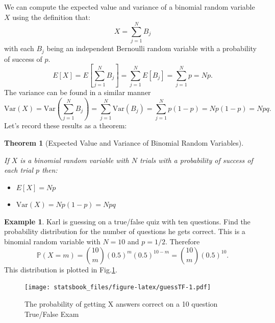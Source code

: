 \documentclass[
]{book}
\providecommand{\tightlist}{%
  \setlength{\itemsep}{0pt}\setlength{\parskip}{0pt}}
\newcommand{\var}{\mathrm{Var}}
\newcommand{\prob}[1]{{\mathbb{P}(#1)}}
\newtheorem{theorem}{Theorem}[chapter]
\theoremstyle{definition}
\theoremstyle{definition}
\newtheorem{example}{Example}[chapter]
\theoremstyle{definition}
\theoremstyle{definition}
\theoremstyle{remark}
\begin{document}
We can compute the expected value and variance of a binomial random variable \(X\) using the definition that:
\[X=\sum_{j=1}^N B_j\]
with each \(B_j\) being an independent Bernoulli random variable with a probability of success of \(p\). \[E[X]=E\left[\sum_{j=1}^N B_j\right]=\sum_{j=1}^N E[B_j]=\sum_{j=1}^N p=Np.\] The variance can be found in a similar manner \[\var(X)=\var\left(\sum_{j=1}^N B_j\right)=\sum_{j=1}^N \var(B_j)=\sum_{j=1}^N p(1-p)=Np(1-p)=Npq.\] Let's record these results as a theorem:

\begin{theorem}[Expected Value and Variance of Binomial Random Variables]
\protect\hypertarget{thm:unnamed-chunk-277}{}\label{thm:unnamed-chunk-277}

If \(X\) is a binomial random variable with \(N\) trials with a probability of success of each trial \(p\) then:

\begin{itemize}
\tightlist
\item
  \(E[X]=Np\)
\item
  \(\var(X)=Np(1-p)=Npq\)
\end{itemize}

\end{theorem}

\begin{example}
\protect\hypertarget{exm:unnamed-chunk-278}{}\label{exm:unnamed-chunk-278}Karl is guessing on a true/false quiz with ten questions. Find the probability distribution for the number of questions he gets correct.
This is a binomial random variable with \(N=10\) and \(p=1/2\). Therefore \[\prob{X=m}=\binom{10}{m} (0.5)^m (0.5)^{10-m}=\binom{10}{m} (0.5)^{10}.\] This distribution is plotted in Fig.\ref{fig:guessTF}.
\end{example}

\begin{figure}
\centering
\texttt{[image: statsbook\_files/figure-latex/guessTF-1.pdf]}
\caption{\label{fig:guessTF}The probability of getting X answers correct on a 10 question True/False Exam}
\end{figure}
\end{document}
